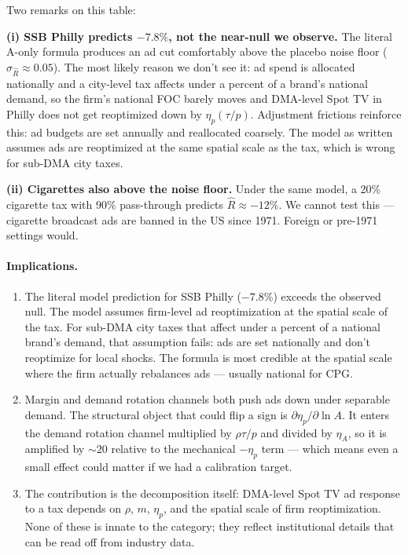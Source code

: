 \documentclass[11pt]{article}
\begin{document}
\noindent Two remarks on this table:

\textbf{(i) SSB Philly predicts $-7.8\%$, not the
near-null we observe.} The literal A-only formula
produces an ad cut comfortably above the placebo
noise floor ($\sigma_{\hat R} \approx 0.05$). The most
likely reason we don't see it: ad spend is allocated
nationally and a city-level tax affects under a
percent of a brand's national demand, so the firm's
national FOC barely moves and DMA-level Spot TV in
Philly does not get reoptimized down by $\eta_p
(\tau/p)$. Adjustment frictions reinforce this: ad
budgets are set annually and reallocated coarsely. The
model as written assumes ads are reoptimized at the
same spatial scale as the tax, which is wrong for
sub-DMA city taxes.

\textbf{(ii) Cigarettes also above the noise floor.}
Under the same model, a 20\% cigarette tax with 90\%
pass-through predicts $\hat R \approx -12\%$. We
cannot test this --- cigarette broadcast ads are
banned in the US since 1971. Foreign or pre-1971
settings would.

\paragraph{Implications.}
\begin{enumerate}
    \item The literal model prediction for SSB Philly
    ($-7.8\%$) exceeds the observed null. The model
    assumes firm-level ad reoptimization at the spatial
    scale of the tax. For sub-DMA city taxes that
    affect under a percent of a national brand's
    demand, that assumption fails: ads are set
    nationally and don't reoptimize for local shocks.
    The formula is most credible at the spatial scale
    where the firm actually rebalances ads --- usually
    national for CPG.

    \item Margin and demand rotation channels both
    push ads down under separable demand. The
    structural object that could flip a sign is
    $\partial \eta_p / \partial \ln A$. It enters the
    demand rotation channel multiplied by $\rho\tau/p$
    and divided by $\eta_A$, so it is amplified by
    $\sim 20$ relative to the mechanical $-\eta_p$
    term --- which means even a small effect could
    matter if we had a calibration target.

    \item The contribution is the decomposition
    itself: DMA-level Spot TV ad response to a tax
    depends on $\rho$, $m$, $\eta_p$, and the spatial
    scale of firm reoptimization. None of these is
    innate to the category; they reflect institutional
    details that can be read off from industry data.
\end{enumerate}
\end{document}

